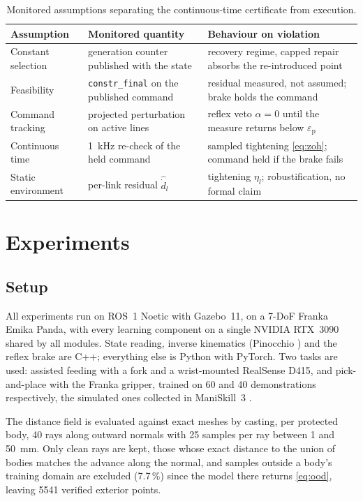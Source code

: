 \documentclass[journal]{IEEEtran}
\begin{document}
\begin{table}[t]
\caption{Monitored assumptions separating the continuous-time certificate from execution.}
\label{tab:assumptions}
\centering
\footnotesize
\renewcommand{\arraystretch}{1.15}
\begin{tabular}{@{}p{1.9cm}p{2.6cm}p{2.7cm}@{}}
\toprule
\textbf{Assumption} & \textbf{Monitored quantity} & \textbf{Behaviour on violation}\\
\midrule
Constant selection & generation counter published with the state & recovery regime, capped repair absorbs the re-introduced point\\
Feasibility & \texttt{constr\_final} on the published command & residual measured, not assumed; brake holds the command\\
Command tracking & projected perturbation on active lines & reflex veto $\alpha=0$ until the measure returns below $\varepsilon_{\mathrm{p}}$\\
Continuous time & 1~kHz re-check of the held command & sampled tightening \eqref{eq:zoh}; command held if the brake fails\\
Static environment & per-link residual $\hat{\dot d}_l$ & tightening $\eta_l$; robustification, no formal claim\\
\bottomrule
\end{tabular}
\end{table}

\section{Experiments}

\subsection{Setup}
All experiments run on ROS~1 Noetic with Gazebo~11, on a 7-DoF Franka Emika Panda, with every learning component on a single NVIDIA RTX~3090 shared by all modules. State reading, inverse kinematics (Pinocchio \cite{Carpentier2019Pinocchio}) and the reflex brake are C++; everything else is Python with PyTorch. Two tasks are used: assisted feeding with a fork and a wrist-mounted RealSense D415, and pick-and-place with the Franka gripper, trained on 60 and 40 demonstrations respectively, the simulated ones collected in ManiSkill~3 \cite{Xiang_2020_SAPIEN}.

The distance field is evaluated against exact meshes by casting, per protected body, 40 rays along outward normals with 25 samples per ray between 1 and 50~mm. Only clean rays are kept, those whose exact distance to the union of bodies matches the advance along the normal, and samples outside a body's training domain are excluded (7.7\,\%) since the model there returns \eqref{eq:ood}, leaving 5541 verified exterior points.
\end{document}

